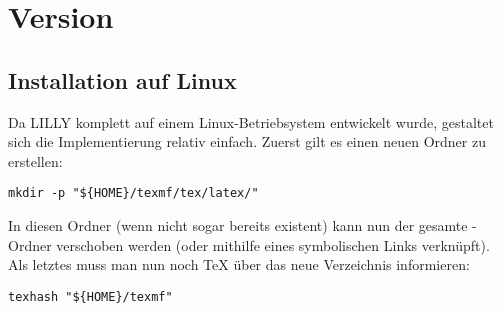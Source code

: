 \section{Version \small{}}
\subsection{Installation auf Linux}
Da LILLY komplett auf einem Linux-Betriebsystem entwickelt wurde, gestaltet sich die Implementierung relativ einfach. 
Zuerst gilt es einen neuen Ordner zu erstellen:
\begin{lstlisting}[style=bash]
mkdir -p "${HOME}/texmf/tex/latex/"
\end{lstlisting}
In diesen Ordner (wenn nicht sogar bereits existent) kann nun der gesamte -Ordner verschoben werden (oder mithilfe eines symbolischen Links verknüpft). Als letztes muss man nun noch \TeX{} über das neue Verzeichnis informieren:
\begin{lstlisting}[style=bash]
texhash "${HOME}/texmf"
\end{lstlisting}

